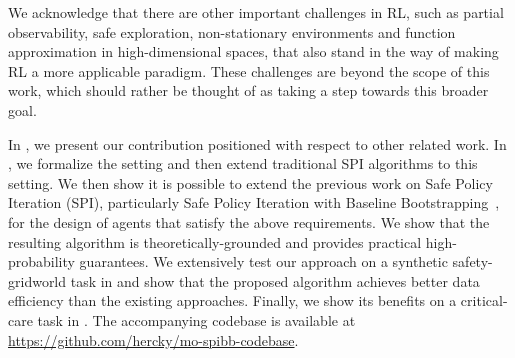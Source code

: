 We acknowledge that there are other important challenges in RL, 
such as partial observability, safe exploration, non-stationary environments and function approximation in high-dimensional spaces, that also stand in the way of making RL a more applicable paradigm. These challenges are beyond the scope of this work, which should rather be thought of as taking a step towards this broader goal.

In , we present our contribution positioned with respect to other related work. 
In , we formalize the setting and then extend traditional SPI algorithms to this setting. 
We then show it is possible to extend the previous work on Safe Policy Iteration (SPI), particularly Safe Policy Iteration with Baseline Bootstrapping~\citep[SPIBB,][]{laroche2017safe},  for the design of agents that satisfy the above requirements. 
We show that the resulting algorithm is theoretically-grounded and provides practical high-probability guarantees. 
We extensively test our approach on a synthetic safety-gridworld task in  and show that the proposed algorithm achieves better data efficiency than the existing approaches.
Finally, we show its benefits on a critical-care task in  . 
The accompanying codebase is available at \url{https://github.com/hercky/mo-spibb-codebase}.